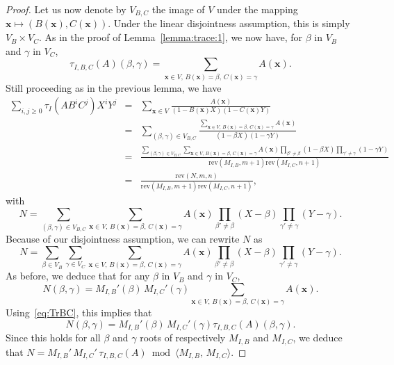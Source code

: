 \documentclass[12pt]{article}
\def\rev {\ensuremath{\mathrm{rev}}}
\def\x {\ensuremath{\mathbf{x}}}
\begin{document}
\begin{proof}
  Let us now denote by $V_{B,C}$ the image of $V$ under the mapping
  $\x \mapsto (B(\x),C(\x))$. Under the linear disjointness
  assumption, this is simply $V_B \times V_C$. As in the proof of
  Lemma~\ref{lemma:trace:1}, we now have, for $\beta$ in $V_B$ and $\gamma$ in $V_C$,
  \begin{equation}\label{eq:TrBC}
    \tau_{I,B,C}(A)(\beta,\gamma) = \sum_{\x \in V,\, B(\x)=\beta,\, C(\x)=\gamma} A(\x).  
  \end{equation}
  Still proceeding as in the previous lemma, we have
\begin{eqnarray*}
\sum_{i,j \ge 0} \tau_I(A B^i C^j) X^i Y^j &=& \sum_{\x \in V}  \frac{A(\x)}{(1-B(\x)X)(1-C(\x)Y)}\\
&=& \sum_{(\beta,\gamma) \in V_{B,C}} \frac{\sum_{\x \in V,\, B(\x)=\beta,\, C(\x)=\gamma} A(\x)}{(1-\beta X)(1-\gamma Y)}\\
&=&\frac{\sum_{(\beta,\gamma) \in V_{B,C}} \sum_{\x \in V,\, B(\x)=\beta,\, C(\x)=\gamma} A(\x)
  \prod_{\beta'\ne \beta} (1-\beta X) \prod_{\gamma' \ne \gamma} (1-\gamma Y)}
  {\rev(M_{I,B},m+1) \rev(M_{I,C},n+1) }\\
&=& \frac{\rev(N,m,n)}  {\rev(M_{I,B},m+1) \rev(M_{I,C},n+1) },
\end{eqnarray*}
with 
$$N = \sum_{(\beta,\gamma) \in V_{B,C}} \sum_{\x \in V,\, B(\x)=\beta,\, C(\x)=\gamma} A(\x)
  \prod_{\beta'\ne \beta} (X-\beta ) \prod_{\gamma' \ne \gamma} (Y-\gamma ).$$
Because of our disjointness assumption, we can rewrite $N$ as 
$$N = \sum_{\beta \in V_B} \sum_{\gamma \in V_C} \sum_{\x \in V,\, B(\x)=\beta,\, C(\x)=\gamma} A(\x)
  \prod_{\beta'\ne \beta} (X-\beta ) \prod_{\gamma' \ne \gamma} (Y-\gamma ).$$
As before, we deduce that for any $\beta$ in $V_B$ and $\gamma$ in $V_C$, 
$$N(\beta,\gamma)= M_{I,B}'(\beta)\, M_{I,C}'(\gamma) \sum_{\x \in V,\, B(\x)=\beta,\, C(\x)=\gamma} A(\x).$$
Using~\eqref{eq:TrBC}, this implies that 
$$N(\beta,\gamma)= M_{I,B}'(\beta)\, M_{I,C}'(\gamma) \tau_{I,B,C}(A)(\beta,\gamma).$$
Since this holds for all $\beta$ and $\gamma$ roots of respectively
$M_{I,B}$ and $M_{I,C}$, we deduce that
$N=M_{I,B}'\, M_{I,C}'\, \tau_{I,B,C}(A) \bmod \langle M_{I,B},\, M_{I,C}\rangle$.
\end{proof}
\end{document}
